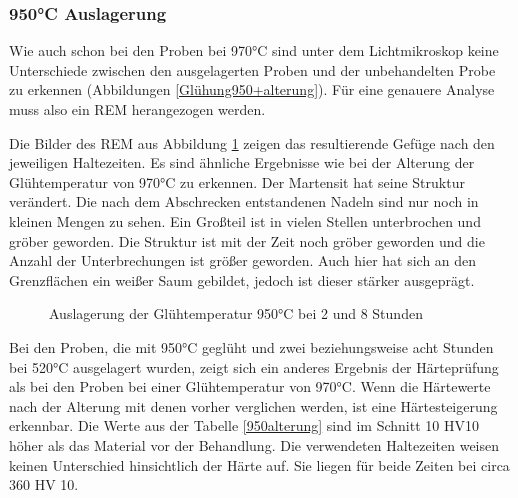 \documentclass[a4paper, 11pt]{tubsreprt}
\begin{document}
\subsubsection{950°C Auslagerung}
Wie auch schon bei den Proben bei 970°C sind unter dem Lichtmikroskop keine Unterschiede zwischen den ausgelagerten Proben und der unbehandelten Probe zu erkennen (Abbildungen \ref{Glühung950+alterung}). Für eine genauere Analyse muss also ein REM herangezogen werden.

Die Bilder des REM aus Abbildung \ref{REM 950 2 und 8} zeigen das resultierende Gefüge nach den jeweiligen Haltezeiten. Es sind ähnliche Ergebnisse wie bei der Alterung der Glühtemperatur von 970°C zu erkennen. Der Martensit hat seine Struktur verändert. Die nach dem Abschrecken entstandenen Nadeln sind nur noch in kleinen Mengen zu sehen. Ein Großteil ist in vielen Stellen unterbrochen und gröber geworden. Die Struktur ist mit der Zeit noch gröber geworden und die Anzahl der Unterbrechungen ist größer geworden. Auch hier hat sich an den Grenzflächen ein weißer Saum gebildet,  jedoch ist dieser stärker ausgeprägt.
\begin{figure}
\label{REM 950 2 und 8}
\caption{Auslagerung der Glühtemperatur 950°C bei 2 und 8 Stunden}
\end{figure}

Bei den Proben, die mit 950°C geglüht und zwei beziehungsweise acht Stunden bei 520°C ausgelagert wurden, zeigt sich ein anderes Ergebnis der Härteprüfung als bei den Proben bei einer Glühtemperatur von 970°C. Wenn die Härtewerte nach der Alterung mit denen vorher verglichen werden, ist eine Härtesteigerung erkennbar. Die Werte aus der Tabelle \ref{950alterung} sind im Schnitt 10 HV10 höher als das Material vor der Behandlung. Die verwendeten Haltezeiten weisen keinen Unterschied hinsichtlich der Härte auf. Sie liegen für beide Zeiten bei circa 360 HV 10.
\end{document}
